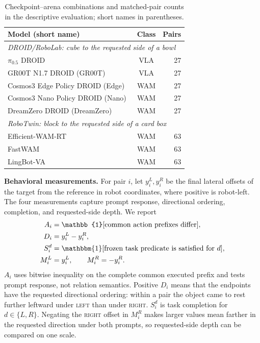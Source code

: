 \documentclass[letterpaper,10pt,conference]{ieeeconf}%
\newcommand{\tokL}{\textsc{left}}
\newcommand{\tokR}{\textsc{right}}
\newcommand{\tightparagraph}[1]{\vspace{0.25em}\noindent\textbf{#1}}
\begin{document}
\begin{table}[t]
  \centering
  \caption{Checkpoint--arena combinations and matched-pair counts in the descriptive evaluation; short names in parentheses.}
  \label{tab:corpus}
  \small
  \begin{tabular}{@{}lcr@{}}
    \toprule
    Model (short name) & Class & Pairs \\
    \midrule
    \multicolumn{3}{l}{\emph{DROID/RoboLab: cube to the requested side of a bowl}}\\
    $\pi_{0.5}$ DROID~\cite{black2025pi05} & VLA & 27\\
    GR00T N1.7 DROID (GR00T)~\cite{bjorck2025gr00t} & VLA & 27\\
    Cosmos3 Edge Policy DROID (Edge)~\cite{nvidia2026cosmos3} & WAM & 27\\
    Cosmos3 Nano Policy DROID (Nano)~\cite{nvidia2026cosmos3} & WAM & 27\\
    DreamZero DROID (DreamZero)~\cite{ye2026dreamzero} & WAM & 27\\
    \midrule
    \multicolumn{3}{l}{\emph{RoboTwin: block to the requested side of a card box}}\\
    Efficient-WAM-RT~\cite{li2026efficientwam} & WAM & 63\\
    FastWAM~\cite{yuan2026fastwam} & WAM & 63\\
    LingBot-VA~\cite{hf2026lingbotva} & WAM & 63\\
    \bottomrule
  \end{tabular}
\end{table}

\tightparagraph{Behavioral measurements.}
For pair $i$, let $y_i^L,y_i^R$ be the final lateral offsets of the target from the reference in robot coordinates, where positive is robot-left.
The four measurements capture prompt response, directional ordering, completion, and requested-side depth.
We report
\begin{align}
A_i &= \mathbb{1}[\text{common action prefixes differ}],\\
D_i &= y_i^L-y_i^R,\\
S_i^d &= \mathbbm{1}[\text{frozen task predicate is satisfied for }d],\\
M_i^L &= y_i^L,\qquad M_i^R = -y_i^R.
\end{align}
$A_i$ uses bitwise inequality on the complete common executed prefix and tests prompt response, not relation semantics.
Positive $D_i$ means that the endpoints have the requested directional ordering: within a pair the object came to rest further leftward under \tokL{} than under \tokR{}.
$S_i^d$ is task completion for $d\in\{L,R\}$.
Negating the \tokR{} offset in $M_i^R$ makes larger values mean farther in the requested direction under both prompts, so requested-side depth can be compared on one scale.
\end{document}
